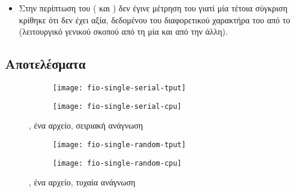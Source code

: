 \begin{itemize}
          \footnote{}
          \cite{virtiofs-tests}. Το συγκεκριμένο ακυρώνει τις 
          και  χρησιμοποιώντας το 
          () %
          πριν από κάθε εκτέλεση του .
    \item Στην περίπτωση του \linux{} (\guest{} και \host{}) δεν έγινε μέτρηση
          του  γιατί μία τέτοια σύγκριση κρίθηκε ότι δεν έχει
          αξία, δεδομένου του διαφορετικού χαρακτήρα του από το \osv{}
          (λειτουργικό γενικού σκοπού από τη μία και  από την
          άλλη).
\end{itemize}

\subsection{Αποτελέσματα}

\begin{figure}
    \begin{minipage}[c][\textheight]{\textwidth}
        \begin{subfigure}[c][0.5\textheight]{\textwidth}
            \caption{}
            \texttt{[image: fio-single-serial-tput]}
            \label{fig:fio-single-serial-tput}
        \end{subfigure}
        \begin{subfigure}[c][0.5\textheight]{\textwidth}
            \caption{}
            \texttt{[image: fio-single-serial-cpu]}
            \label{fig:fio-single-serial-cpu}
        \end{subfigure}
        \caption{, ένα αρχείο, σειριακή ανάγνωση}
        \label{fig:fio-single-serial}
    \end{minipage}
\end{figure}

\begin{figure}
    \begin{minipage}[c][\textheight]{\textwidth}
        \begin{subfigure}[c][0.5\textheight]{\textwidth}
            \caption{}
            \texttt{[image: fio-single-random-tput]}
            \label{fig:fio-single-random-tput}
        \end{subfigure}
        \begin{subfigure}[c][0.5\textheight]{\textwidth}
            \caption{}
            \texttt{[image: fio-single-random-cpu]}
            \label{fig:fio-single-random-cpu}
        \end{subfigure}
        \caption{, ένα αρχείο, τυχαία ανάγνωση}
        \label{fig:fio-single-random}
    \end{minipage}
\end{figure}

